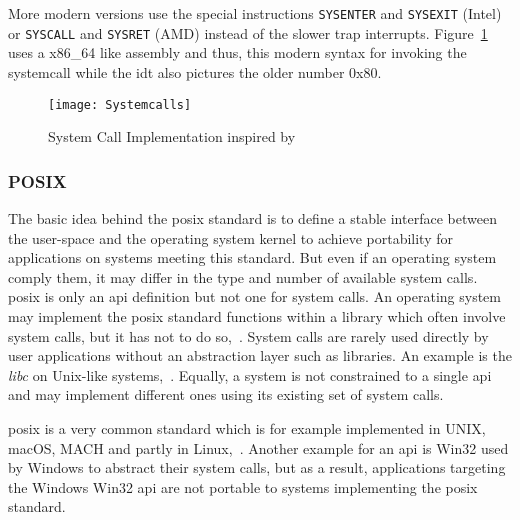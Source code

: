 More modern versions use the special instructions \texttt{SYSENTER} and \texttt{SYSEXIT} (Intel) or \texttt{SYSCALL} and \texttt{SYSRET} (AMD) instead of the slower trap interrupts\cite{decade-linux-syscalls}.
Figure~\ref{pic:syscalls} uses a x86\_64 like assembly and thus, this modern syntax for invoking the systemcall while the \ac{idt} also pictures the older number 0x80.

\begin{figure} [t]
	\centering
	\texttt{[image: Systemcalls]}
    \caption{System Call Implementation inspired by~\cite{lfd430}}\label{pic:syscalls}
\end{figure}


\subsubsection{POSIX}
The basic idea behind the \acf{posix} standard is to define a stable interface between the user-space and the operating system kernel to achieve portability for applications on systems meeting this standard.
But even if an operating system comply them, it may differ in the type and number of available system calls.
\ac{posix} is only an \ac{api} definition but not one for system calls.
An operating system may implement the \ac{posix} standard functions within a library which often involve system calls, but it has not to do so\cite{lfd430},~\cite{glatz2015betriebssysteme}.
System calls are rarely used directly by user applications without an abstraction layer such as libraries. An example is the \textit{libc} on Unix-like systems\cite{lfd430},~\cite{tanenbaum-modern-operating-systems}.
Equally, a system is not constrained to a single \ac{api} and may implement different ones using its existing set of system calls\cite{glatz2015betriebssysteme}.

\ac{posix} is a very common standard which is for example implemented in UNIX, macOS, MACH and partly in Linux\cite{tanenbaum-modern-operating-systems},~\cite{glatz2015betriebssysteme}. 
Another example for an \ac{api} is Win32 used by Windows to abstract their system calls, but as a result, applications targeting the Windows Win32 \ac{api} are not portable to systems implementing the \ac{posix} standard.


